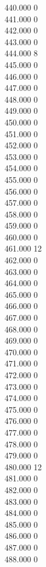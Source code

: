 { 440.000	0 \\
 441.000	0 \\
 442.000	0 \\
 443.000	0 \\
 444.000	8 \\
 445.000	0 \\
 446.000	0 \\
 447.000	0 \\
 448.000	0 \\
 449.000	0 \\
 450.000	0 \\
 451.000	0 \\
 452.000	0 \\
 453.000	0 \\
 454.000	0 \\
 455.000	0 \\
 456.000	0 \\
 457.000	0 \\
 458.000	0 \\
 459.000	0 \\
 460.000	0 \\
 461.000	12 \\
 462.000	0 \\
 463.000	0 \\
 464.000	0 \\
 465.000	0 \\
 466.000	0 \\
 467.000	0 \\
 468.000	0 \\
 469.000	0 \\
 470.000	0 \\
 471.000	0 \\
 472.000	0 \\
 473.000	0 \\
 474.000	0 \\
 475.000	0 \\
 476.000	0 \\
 477.000	0 \\
 478.000	0 \\
 479.000	0 \\
 480.000	12 \\
 481.000	0 \\
 482.000	0 \\
 483.000	0 \\
 484.000	0 \\
 485.000	0 \\
 486.000	0 \\
 487.000	0 \\
 488.000	0 \\
}
